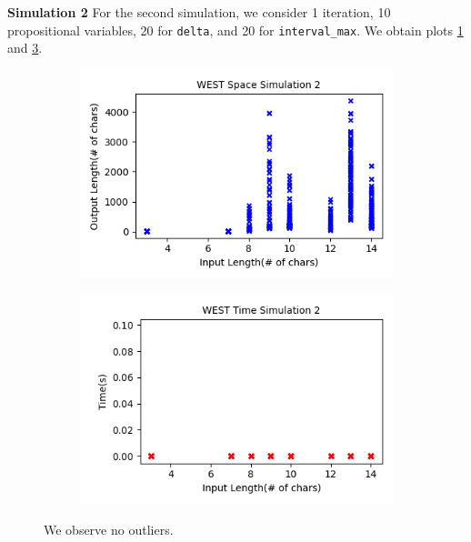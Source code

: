 \documentclass[runningheads]{llncs}
\begin{document}
\noindent\textbf{Simulation 2}
For the second simulation, we consider 1 iteration, 10 propositional variables, 20 for \texttt{delta}, and 20 for \texttt{interval\_max}. We obtain plots \ref{fig:InVsOutLen2} and \ref{fig:InLenVsRunTime2}.
\begin{figure}[H]
\captionsetup[subfigure]{aboveskip=-1pt,belowskip=-1pt}
    \centering
    \begin{subfigure}[h]{0.49\textwidth}
    \centering
    \includegraphics[width=\textwidth]{images/WESTspace2.png}
    \caption{}
    \label{fig:InVsOutLen2}
    \end{subfigure}
\begin{subfigure}[h]{0.49\textwidth}
    \centering
    \includegraphics[width=\textwidth]{images/WESTtime2.png}
    \caption{}
    \label{fig:InLenVsRunTime2}
    \end{subfigure}
    \caption{We observe no outliers.}
\end{figure}
\end{document}
